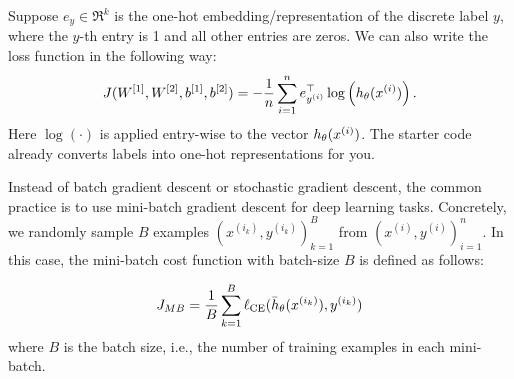 Suppose $e_y\in \Re^k$ is the one-hot embedding/representation of the discrete label $y$, where the $y$-th entry is 1 and all other entries are zeros. We can also write the loss function in the following way:
  \begin{equation*}
  J(W^{[1]},W^{[2]},b^{[1]},b^{[2]}) = - \frac{1}{{n}}\sum_{i=1}^{n} e_{y^{(i)}}^\top\log\left(h_\theta(x^{(i)})\right).
  \end{equation*}
Here $\log(\cdot)$ is applied entry-wise to the vector $h_\theta(x^{(i)})$. The starter code already converts labels into one-hot representations for you.


Instead of batch gradient descent or stochastic gradient descent, the common practice
is to use mini-batch gradient descent for deep learning tasks. Concretely, we randomly sample $B$ examples $(x^{(i_k)}, y^{(i_k)})_{k=1}^B$ from $(x^{(i)}, y^{(i)})_{i=1}^n$. In this case, the
mini-batch cost function with batch-size $B$ is defined as follows:

  \begin{equation*}
  J_{MB} = \frac{1}{B}\sum_{k=1}^B \ell_\textup{CE}(\bar{h}_{\theta}(x^{(i_k)}),y^{(i_k)})
  \end{equation*}
where $B$ is the batch size, i.e., the number of training examples in each mini-batch.

\begin{enumerate}
  

\ifnum{} {
  
} \fi

  

\ifnum{} {
  
} \fi

  

\ifnum{} {
  
} \fi


  
\ifnum{} {
  
} \fi

  
\ifnum{} {
  
} \fi

 \end{enumerate}

